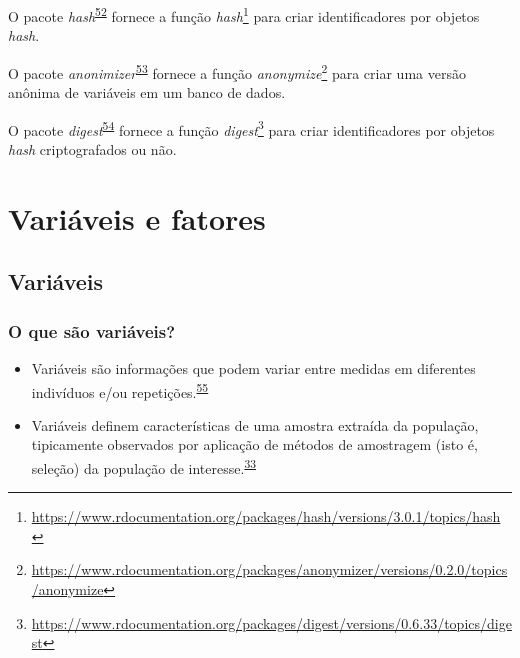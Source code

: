 \documentclass[
  a4paper,
]{book}
\renewcommand{\href}[2]{#2\footnote{\url{#1}}}
\newenvironment{infobox}[1]
  {
  \begin{itemize}
  \renewcommand{\labelitemi}{
    \raisebox{-.7\height}[0pt][0pt]{
      {\setkeys{Gin}{width=3em,keepaspectratio}
        \texttt{[image: \#1]}}
    }
  }
  \setlength{\fboxsep}{1em}
  \begin{blackbox}
  \item
  }
  {
  \end{blackbox}
  \end{itemize}
  }
\begin{document}
\begin{infobox}{images/Rlogo}
O pacote \emph{hash}\textsuperscript{\protect\hyperlink{ref-hash}{52}} fornece a função \href{https://www.rdocumentation.org/packages/hash/versions/3.0.1/topics/hash}{\emph{hash}} para criar identificadores por objetos \emph{hash}.

\end{infobox}

\begin{infobox}{images/Rlogo}
O pacote \emph{anonimizer}\textsuperscript{\protect\hyperlink{ref-anonymizer}{53}} fornece a função \href{https://www.rdocumentation.org/packages/anonymizer/versions/0.2.0/topics/anonymize}{\emph{anonymize}} para criar uma versão anônima de variáveis em um banco de dados.

\end{infobox}

\begin{infobox}{images/Rlogo}
O pacote \emph{digest}\textsuperscript{\protect\hyperlink{ref-digest}{54}} fornece a função \href{https://www.rdocumentation.org/packages/digest/versions/0.6.33/topics/digest}{\emph{digest}} para criar identificadores por objetos \emph{hash} criptografados ou não.

\end{infobox}

\hypertarget{variaveis-fatores}{%
\chapter{\texorpdfstring{\textbf{Variáveis e fatores}}{Variáveis e fatores}}\label{variaveis-fatores}}

\hypertarget{variaveis}{%
\section{Variáveis}\label{variaveis}}

\hypertarget{o-que-suxe3o-variuxe1veis}{%
\subsection{O que são variáveis?}\label{o-que-suxe3o-variuxe1veis}}

\begin{itemize}
\item
  Variáveis são informações que podem variar entre medidas em diferentes indivíduos e/ou repetições.\textsuperscript{\protect\hyperlink{ref-Altman1999}{55}}
\item
  Variáveis definem características de uma amostra extraída da população, tipicamente observados por aplicação de métodos de amostragem (isto é, seleção) da população de interesse.\textsuperscript{\protect\hyperlink{ref-vetter2017}{33}}
\end{itemize}
\end{document}
